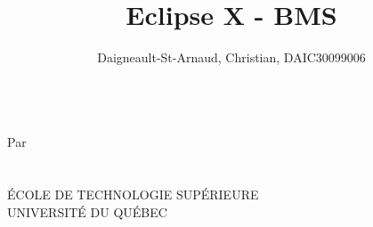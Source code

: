 \documentclass[12pt,letterpaper]{article}
\title{Eclipse X - BMS}
\author{
	Daigneault-St-Arnaud, Christian, DAIC30099006
}
\newcommand{\cours}{ }
\newcommand{\prof}{ }
\begin{document}
	
	\begin{titlepage}
	\makeatletter
		\centering
		\vspace{5cm}
		{\Huge \@title}\\ 
		\vspace{5cm}
		{\large 
			Par \\
			\vspace{0.5cm}
			\@author \\
			\vspace{5cm}
			\@date \\
			\vspace{5cm}
			\'{E}COLE DE TECHNOLOGIE SUP\'{E}RIEURE \\
			UNIVERSIT\'{E} DU QUÉBEC
		}
		\newpage
	\end{titlepage}
	\tableofcontents
	\newpage
\end{document}
